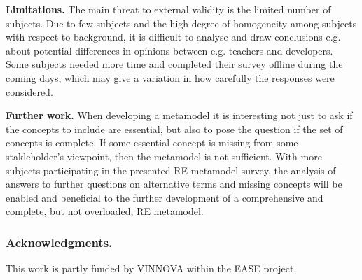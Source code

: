 \documentclass[a4paper]{llncs}
\begin{document}
{\bf Limitations. } The main threat to external validity is the limited number of subjects. Due to few subjects and the high degree of homogeneity among subjects with respect to background, it is difficult to analyse and draw conclusions e.g. about potential differences in opinions between e.g. teachers and developers. Some subjects needed more time and completed their survey offline during the coming days, which may give a variation in how carefully the responses were considered. 
 
{\bf Further work.} When developing a metamodel it is interesting not just to ask if the concepts to include are essential, but also to pose the question if the set of concepts is complete. If some essential concept is missing from some stakleholder's viewpoint, then the metamodel is not sufficient.  With more subjects participating in the presented RE metamodel survey, the analysis of answers to further questions on alternative terms and missing concepts will be enabled and beneficial to the further development of a comprehensive and complete, but not overloaded, RE metamodel. %


\vspace{-0.2cm}

\subsubsection*{Acknowledgments.} This work is partly funded by  VINNOVA within the EASE project.
\end{document}
